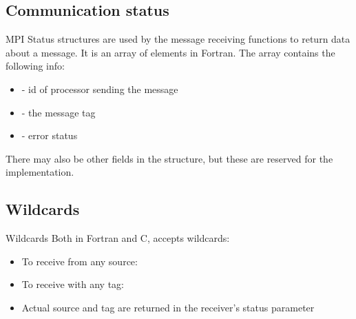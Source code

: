 \documentclass[aspectratio=43]{beamer}
\begin{document}
\subsection{Communication status}
\begin{frame}[fragile]{MPI Status}
\justifying
{} structures are used by the message receiving functions to return data about a message.
It is an  array of  elements in Fortran.
The array contains the following info:
\begin{itemize}
\item {} - id of processor sending the message
\item {} - the message tag
\item {} - error status
\end{itemize}
There may also be other fields in the structure, but these are reserved for the implementation.
\end{frame}

\subsection{Wildcards}
\begin{frame}[fragile]{Wildcards}
    Both in Fortran and C,   accepts wildcards:
\begin{itemize}
    \item To receive from any source: 
    \item To receive with any tag: 
\item Actual source and tag are returned in the receiver’s status parameter
\end{itemize}
\end{frame}
\end{document}
